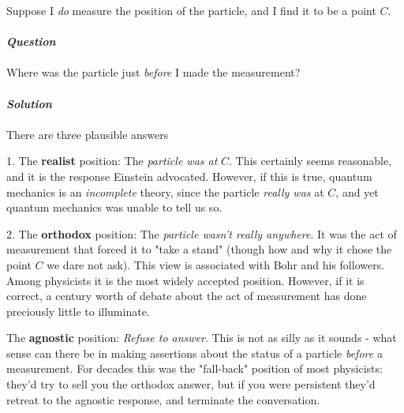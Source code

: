 \documentclass[svgnames]{article}   	%
\begin{document}
Suppose I \textit{do} measure the position of the particle, and I find it to be
a point $C$. \mbox{}\\ \\

\textbf{\textit{Question}}\\\\
Where was the particle just  \textit{before} I made the measurement? \\\\

\textbf{\textit{Solution}}\\\\
There are three plausible answers \vspace{5px}

\begin{tcolorbox}	
  
  1. The \textbf{realist} position: The \textit{particle was at} $C$. This
     certainly seems reasonable, and it is the response Einstein advocated.
     However, if this is true, quantum mechanics is an \textit{incomplete}
     theory, since the particle \textit{really was} at $C$, and yet quantum
     mechanics was unable to tell us so. 

\end{tcolorbox} \vspace{5px}

\begin{tcolorbox}	
  
  2. The \textbf{orthodox} position: The \textit{particle wasn't really
anywhere}. It was the act of measurement that forced it to "take a stand"
(though how and why it chose the point $C$ we dare not ask). This view is
associated with Bohr and his followers. Among physicists it is the most widely
accepted position. However, if it is correct, a century worth of debate about
the act of measurement has done preciously little to illuminate. 

\end{tcolorbox}	\vspace{5px}

\begin{tcolorbox}	
  
  The \textbf{agnostic} position: \textit{Refuse to answer}. This is not as
  silly as it sounds - what sense can there be in making assertions about the
  status of a particle \textit{before} a measurement. For decades this was the
  "fall-back" position of most physicists: they'd try to sell you the orthodox
  answer, but if you were persistent they'd retreat to the agnostic response,
  and terminate the conversation.

\end{tcolorbox} \vspace{20px}	
\end{document}
